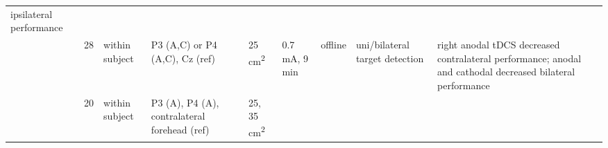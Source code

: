 \documentclass[11pt,english,]{memoir}
\begin{document}
\begin{longtable}[]{@{}lllllllll@{}}
\begin{minipage}[t]{0.24\columnwidth}
ipsilateral performance\strut
\end{minipage}\tabularnewline
\begin{minipage}[t]{0.12\columnwidth}\raggedright
\textcite{Filmer2015}\strut
\end{minipage} & \begin{minipage}[t]{0.02\columnwidth}\raggedright
28\strut
\end{minipage} & \begin{minipage}[t]{0.04\columnwidth}\raggedright
within
subject\strut
\end{minipage} & \begin{minipage}[t]{0.11\columnwidth}\raggedright
P3 (A,C) or P4 (A,C), Cz
(ref)\strut
\end{minipage} & \begin{minipage}[t]{0.03\columnwidth}\raggedright
25
cm\textsuperscript{2}\strut
\end{minipage} & \begin{minipage}[t]{0.05\columnwidth}\raggedright
0.7 mA, 9
min\strut
\end{minipage} & \begin{minipage}[t]{0.05\columnwidth}\raggedright
offline\strut
\end{minipage} & \begin{minipage}[t]{0.11\columnwidth}\raggedright
uni/bilateral target
detection\strut
\end{minipage} & \begin{minipage}[t]{0.24\columnwidth}\raggedright
right anodal tDCS decreased contralateral performance;
anodal and cathodal decreased bilateral performance\strut
\end{minipage}\tabularnewline
\begin{minipage}[t]{0.12\columnwidth}\raggedright
\textcite{Learmonth2015}\strut
\end{minipage} & \begin{minipage}[t]{0.02\columnwidth}\raggedright
20\strut
\end{minipage} & \begin{minipage}[t]{0.04\columnwidth}\raggedright
within
subject\strut
\end{minipage} & \begin{minipage}[t]{0.11\columnwidth}\raggedright
P3 (A), P4 (A),
contralateral forehead
(ref)\strut
\end{minipage} & \begin{minipage}[t]{0.03\columnwidth}\raggedright
25,
35
cm\textsuperscript{2}\strut
\end{minipage} & \begin{minipage}[t]{0.05\columnwidth}\raggedright

\end{minipage}
\end{longtable}
\end{document}
